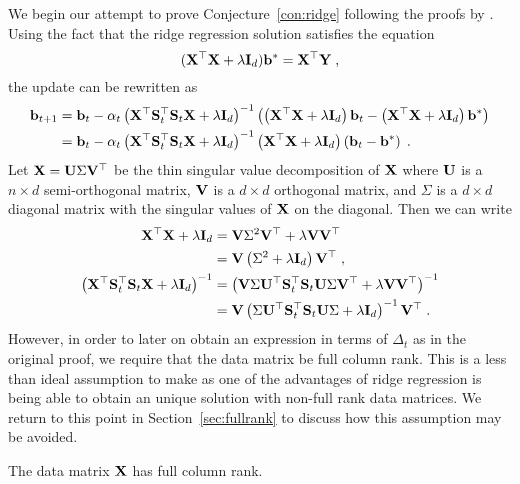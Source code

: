 We begin our attempt to prove Conjecture~\ref{con:ridge} following the proofs by \citet{Lacotte:2020}. Using the fact that the ridge regression solution satisfies the equation
\[
(\mathbf{X}^\top\mathbf{X} + \lambda\mathbf{I}_d)\mathbf{b}^* = \mathbf{X}^\top\mathbf{Y} \;,
\]
the update can be rewritten as
\begin{align*}
\mathbf{b}_{t+1} &= \mathbf{b}_t - \alpha_t\left(\mathbf{X}^\top\mathbf{S}_t^\top\mathbf{S}_t\mathbf{X} + \lambda\mathbf{I}_d\right)^{-1}\left(\left(\mathbf{X}^\top\mathbf{X}+\lambda\mathbf{I}_d\right)\mathbf{b}_t-\left(\mathbf{X}^\top\mathbf{X}+\lambda\mathbf{I}_d\right)\mathbf{b}^*\right) \\
&= \mathbf{b}_t - \alpha_t\left(\mathbf{X}^\top\mathbf{S}_t^\top\mathbf{S}_t\mathbf{X} + \lambda\mathbf{I}_d\right)^{-1}\left(\mathbf{X}^\top\mathbf{X}+\lambda\mathbf{I}_d\right)\left(\mathbf{b}_t-\mathbf{b}^*\right) \;.
\end{align*}
Let $\mathbf{X} = \mathbf{U}\Sigma\mathbf{V}^\top$ be the thin singular value decomposition of $\mathbf{X}$ where $\mathbf{U}$ is a $n\times d$ semi-orthogonal matrix, $\mathbf{V}$ is a $d\times d$ orthogonal matrix, and $\Sigma$ is a $d\times d$ diagonal matrix with the singular values of $\mathbf{X}$ on the diagonal. Then we can write
\begin{align*}
\mathbf{X}^\top\mathbf{X}+\lambda\mathbf{I}_d &= \mathbf{V}\Sigma^2\mathbf{V}^\top + \lambda \mathbf{V}\mathbf{V}^\top \\
&= \mathbf{V}\left(\Sigma^2+ \lambda\mathbf{I}_d\right)\mathbf{V}^\top \;, \\
\left(\mathbf{X}^\top\mathbf{S}_t^\top\mathbf{S}_t\mathbf{X} + \lambda\mathbf{I}_d\right)^{-1} &= \left(\mathbf{V}\Sigma\mathbf{U}^\top\mathbf{S}_t^\top\mathbf{S}_t\mathbf{U}\Sigma\mathbf{V}^\top + \lambda\mathbf{V}\mathbf{V}^\top\right)^{-1} \\
&= \mathbf{V}\left(\Sigma\mathbf{U}^\top\mathbf{S}_t^\top\mathbf{S}_t\mathbf{U}\Sigma + \lambda\mathbf{I}_d\right)^{-1}\mathbf{V}^\top \;.
\end{align*}
However, in order to later on obtain an expression in terms of $\Delta_t$ as in the original proof, we require that the data matrix be full column rank. This is a less than ideal assumption to make as one of the advantages of ridge regression is being able to obtain an unique solution with non-full rank data matrices. We return to this point in Section~\ref{sec:fullrank} to discuss how this assumption may be avoided.

\begin{assumption} \label{asp:rank}
The data matrix $\mathbf{X}$ has full column rank.
\end{assumption}

